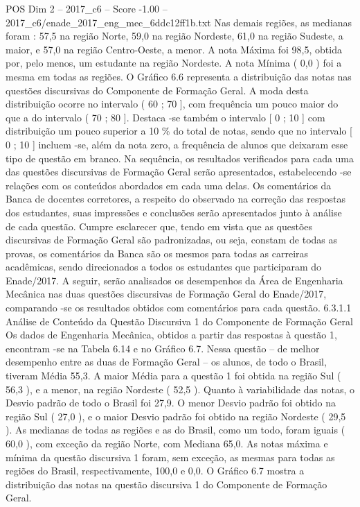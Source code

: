 \begin{textsample}{POS Dim 2 – 2017\_c6 – Score -1.00 – 2017\_c6/enade\_2017\_eng\_mec\_6ddc12ff1b.txt}
Nas demais regiões, as medianas foram : 57,5 na região Norte, 59,0 na região Nordeste, 61,0 na região Sudeste, a maior, e 57,0 na região Centro-Oeste, a menor.
A nota Máxima foi 98,5, obtida por, pelo menos, um estudante na região Nordeste.
A nota Mínima ( 0,0 ) foi a mesma em todas as regiões.
O Gráfico 6.6 representa a distribuição das notas nas questões discursivas do Componente de Formação Geral.
A moda desta distribuição ocorre no intervalo ( 60 ; 70 ], com frequência um pouco maior do que a do intervalo ( 70 ; 80 ].
Destaca -se também o intervalo [ 0 ; 10 ] com distribuição um pouco superior a 10 \% do total de notas, sendo que no intervalo [ 0 ; 10 ] incluem -se, além da nota zero, a frequência de alunos que deixaram esse tipo de questão em branco.
Na sequência, os resultados verificados para cada uma das questões discursivas de Formação Geral serão apresentados, estabelecendo -se relações com os conteúdos abordados em cada uma delas.
Os comentários da Banca de docentes corretores, a respeito do observado na correção das respostas dos estudantes, suas impressões e conclusões serão apresentados junto à análise de cada questão.
Cumpre esclarecer que, tendo em vista que as questões discursivas de Formação Geral são padronizadas, ou seja, constam de todas as provas, os comentários da Banca são os mesmos para todas as carreiras acadêmicas, sendo direcionados a todos os estudantes que participaram do Enade/2017.
A seguir, serão analisados os desempenhos da Área de Engenharia Mecânica nas duas questões discursivas de Formação Geral do Enade/2017, comparando -se os resultados obtidos com comentários para cada questão. 6.3.1.1 Análise de Conteúdo da Questão Discursiva 1 do Componente de Formação Geral Os dados de Engenharia Mecânica, obtidos a partir das respostas à questão 1, encontram -se na Tabela 6.14 e no Gráfico 6.7.
Nessa questão – de melhor desempenho entre as duas de Formação Geral – os alunos, de todo o Brasil, tiveram Média 55,3.
A maior Média para a questão 1 foi obtida na região Sul ( 56,3 ), e a menor, na região Nordeste ( 52,5 ).
Quanto à variabilidade das notas, o Desvio padrão de todo o Brasil foi 27,9.
O menor Desvio padrão foi obtido na região Sul ( 27,0 ), e o maior Desvio padrão foi obtido na região Nordeste ( 29,5 ).
As medianas de todas as regiões e as do Brasil, como um todo, foram iguais ( 60,0 ), com exceção da região Norte, com Mediana 65,0.
As notas máxima e mínima da questão discursiva 1 foram, sem exceção, as mesmas para todas as regiões do Brasil, respectivamente, 100,0 e 0,0.
O Gráfico 6.7 mostra a distribuição das notas na questão discursiva 1 do Componente de Formação Geral.

\end{textsample}
